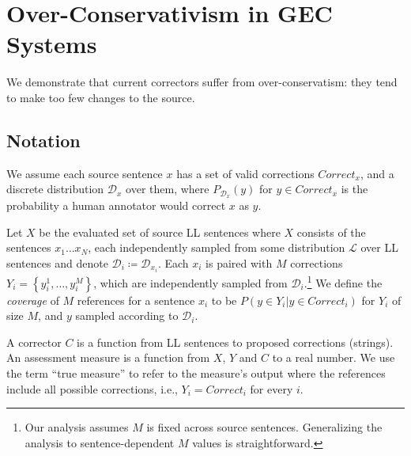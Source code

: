 \documentclass[letterpaper, 11pt]{article}
\begin{document}
\section{Over-Conservativism in GEC Systems}\label{sec:formal_conservatism}
%
%
We demonstrate that current correctors
suffer from over-conservatism: they tend to make too few changes to the source.
\subsection{Notation}
We assume each source sentence $x$ has a set of valid corrections $Correct_x$,
and a discrete distribution $\mathcal{D}_x$ over them, where $P_{\mathcal{D}_x}(y)$
for $y \in Correct_x$ is the probability a human annotator would correct $x$ as $y$.

Let $X$ be the evaluated set of source LL sentences where $X$ consists of the sentences $x_{1}\ldots x_N$, each independently sampled from some distribution $\mathcal{L}$ over LL sentences and denote $\mathcal{D}_{i}\coloneqq \mathcal{D}_{x_i}$.
Each $x_i$ is paired with $M$ corrections $Y_i = \left\{y_{i}^{1},\ldots, y_{i}^{M}\right\}$,
which are independently sampled from $\mathcal{D}_{i}$.\footnote{Our analysis assumes $M$
	is fixed across source sentences. Generalizing the analysis to sentence-dependent $M$
	values is straightforward.}
We define the {\it coverage} of $M$ references for a sentence $x_i$ to be
$P(y \in Y_i|y \in Correct_i)$ for $Y_i$ of size $M$, and $y$ sampled
according to $\mathcal{D}_i$.

A corrector $C$ is a function from LL sentences to proposed corrections (strings).
An assessment measure is a function from $X$, $Y$ and $C$ to
a real number. We use the term ``true measure'' to refer to the measure's output where the references include all possible corrections, i.e., $Y_i=Correct_i$ for every $i$.
\end{document}
